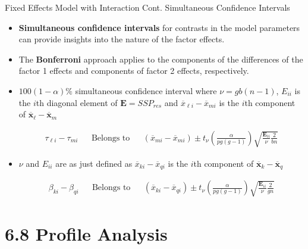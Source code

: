 \documentclass[8pt]{beamer}
\begin{document}
    
    \begin{frame}{Fixed Effects Model with Interaction Cont. Simultaneous Confidence Intervals}
        
        \begin{itemize}
            \item \textbf{Simultaneous confidence intervals} for contrasts in the model parameters can provide insights into the nature of the factor effects. 
            \item The \textbf{Bonferroni} approach applies to the components of the differences of the factor 1 effects and components of factor 2 effects, respectively. 
            
            \item $100(1 - \alpha)\%$ simultaneous confidence interval where $\nu = gb(n-1)$, $E_{ii}$ is the $i$th diagonal element of $\mathbf{E} = SSP_{res}$ and $\overline{x}_{\ell i} - \overline{x}_{mi}$ is the $i$th component of $\overline{\mathbf{x}}_{\ell} - \overline{\mathbf{x}}_{m}$
            
            \begin{align}
                \tau_{\ell i} - \tau_{mi} && \text{Belongs to} && (\overline{x}_{mi} - \overline{x}_{mi}) \pm t_{\nu}\left(\frac{\alpha}{pg(g - 1)}\right)\sqrt{\frac{\mathbf{E}_{ii}}{\nu}\frac{2}{bn}}
            \end{align}
            
            \item $\nu$ and $E_{ii}$ are as just defined as $\overline{x}_{ki} - \overline{x}_{qi}$ is the $i$th component of $\overline{\mathbf{x}}_{k} - \overline{\mathbf{x}}_{q}$
            
            \begin{align}
                \beta_{k i} - \beta_{qi} && \text{Belongs to} && (\overline{x}_{ki} - \overline{x}_{qi}) \pm t_{\nu}\left(\frac{\alpha}{pg(g - 1)}\right)\sqrt{\frac{\mathbf{E}_{ii}}{\nu}\frac{2}{gn}}
            \end{align}
            
        \end{itemize}
        
        
    \end{frame}

\section{6.8 Profile Analysis}
\end{document}
